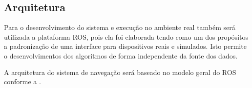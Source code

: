


\subsection{Arquitetura}

Para o desenvolvimento do sistema e execução no ambiente real também será
utilizada a plataforma ROS, pois ela foi elaborada tendo como um dos propósitos
a padronização de uma interface para dispositivos reais e simulados. Isto
permite o desenvolvimentos dos algoritmos de forma independente da fonte dos
dados.

A arquitetura do sistema de navegação será baseado no modelo geral do ROS
conforme a .


